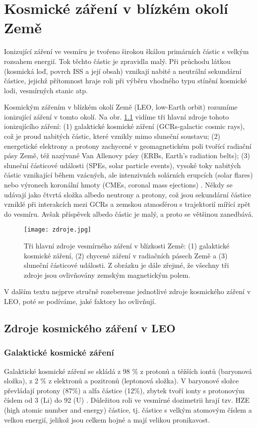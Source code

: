 \chapter{Kosmické záření v blízkém okolí Země}
Ionizující záření ve vesmíru je tvořeno širokou škálou primárních částic s velkým rozsahem energií. Tok těchto částic je zpravidla malý. Při průchodu látkou (kosmická loď, povrch ISS a její obsah) vznikají nabité a neutrální sekundární částice, jejichž přítomnost hraje roli při výběru vhodného typu stínění kosmické lodi, vesmírných stanic atp.   

Kosmickým zářením v blízkém okolí Země (LEO, low-Earth orbit) rozumíme ionizující záření v tomto okolí. Na obr. \ref{fig:zdroje} vidíme tři hlavní zdroje tohoto ionizujícího záření: (1) galaktické kosmické záření (GCRs-galactic cosmic rays), což je proud nabitých částic, které vznikly mimo sluneční soustavu; (2) energetické elektrony a protony zachycené v geomagnetickém poli tvořící radiační pásy Země, též nazývané Van Allenovy pásy (ERBs, Earth's radiation belts); (3) sluneční částicové události (SPEs, solar particle events), vysoké toky nabitých částic vznikající během vzácných, ale intenzivních solárních erupcích (solar flares) nebo výronech koronální hmoty (CMEs, coronal mass ejections) \cite{benton}. Někdy se udávají jako čtvrtá složka albedo neutrony a protony,
což jsou sekundární částice
vzniklé při interakcích mezi GCRs a zemskou atmosférou s trajektorií mířící zpět do vesmíru. Avšak příspěvek albedo částic je malý, a proto se většinou zanedbává.

\begin{figure}[ht]
  \centering
  \texttt{[image: zdroje.jpg]}
  \caption{Tři hlavní zdroje vesmírného záření v blízkosti Země: (1) galaktické kosmické záření, (2) chycené záření v radiačních pásech Země a (3) sluneční částicové události. Z obrázku je dále zřejmé, že všechny tři zdroje jsou ovlivňovány zemským magnetickým polem. \cite{benton}}
  \label{fig:zdroje}
\end{figure}

V dalším textu nejprve stručně rozebereme jednotlivé zdroje kosmického záření v LEO, poté se podíváme, jaké faktory ho ovlivňují.
\section{Zdroje kosmického záření v LEO}
\subsection{Galaktické kosmické záření}
Galaktické kosmické záření se skládá z 98 \% z protonů a těžších iontů (baryonová složka), z 2 \% z elektronů a pozitronů (leptonová složka). V baryonové složce převládají protony (87\%) a alfa částice (12\%), zbytek tvoří ionty s protonovým číslem od 3 (Li) do 92 (U) \cite{benton}. Důležitou roli ve vesmírné dozimetrii hrají tzv. HZE (high atomic number and energy) částice, tj. částice s velkým atomovým číslem a velkou energií, jelikož jsou celkem hojné a mají velikou pronikavost.

